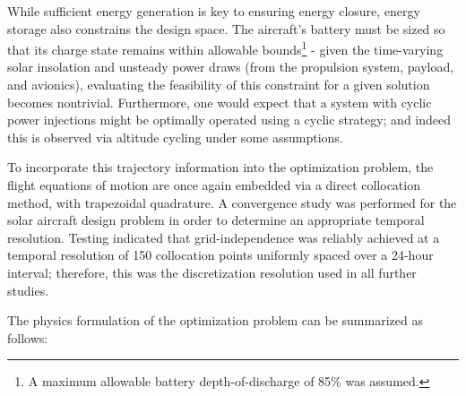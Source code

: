 While sufficient energy generation is key to ensuring energy closure, energy storage also constrains the design space. The aircraft's battery must be sized so that its charge state remains within allowable bounds\footnote{A maximum allowable battery depth-of-discharge of 85\% was assumed.} - given the time-varying solar insolation and unsteady power draws (from the propulsion system, payload, and avionics), evaluating the feasibility of this constraint for a given solution becomes nontrivial. Furthermore, one would expect that a system with cyclic power injections might be optimally operated using a cyclic strategy; and indeed this is observed via altitude cycling under some assumptions.

To incorporate this trajectory information into the optimization problem, the flight equations of motion are once again embedded via a direct collocation method, with trapezoidal quadrature. A convergence study was performed for the solar aircraft design problem in order to determine an appropriate temporal resolution. Testing indicated that grid-independence was reliably achieved at a temporal resolution of 150 collocation points uniformly spaced over a 24-hour interval; therefore, this was the discretization resolution used in all further studies.

The physics formulation of the optimization problem can be summarized as follows:


